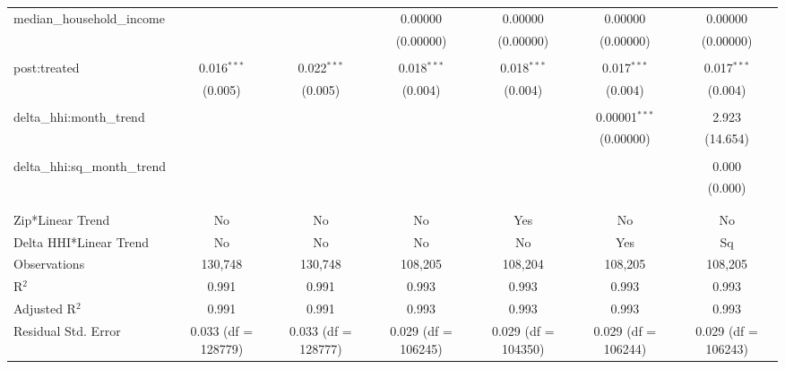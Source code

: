 \begin{table}[H]
{\begin{tabular}{@{\extracolsep{5pt}}lcccccc}
  median\_household\_income &  &  & 0.00000 & 0.00000 & 0.00000 & 0.00000 \\  

   &  &  & (0.00000) & (0.00000) & (0.00000) & (0.00000) \\  

   & & & & & & \\  

  post:treated & 0.016$^{***}$ & 0.022$^{***}$ & 0.018$^{***}$ & 0.018$^{***}$ & 0.017$^{***}$ & 0.017$^{***}$ \\  

   & (0.005) & (0.005) & (0.004) & (0.004) & (0.004) & (0.004) \\  

   & & & & & & \\  

  delta\_hhi:month\_trend &  &  &  &  & 0.00001$^{***}$ & 2.923 \\  

   &  &  &  &  & (0.00000) & (14.654) \\  

   & & & & & & \\  

  delta\_hhi:sq\_month\_trend &  &  &  &  &  & 0.000 \\  

   &  &  &  &  &  & (0.000) \\  

   & & & & & & \\  

 \hline \\[-1.8ex]  

 Zip*Linear Trend & No & No & No & Yes & No & No \\  

 Delta HHI*Linear Trend & No & No & No & No & Yes & Sq \\  

 Observations & 130,748 & 130,748 & 108,205 & 108,204 & 108,205 & 108,205 \\  

 R$^{2}$ & 0.991 & 0.991 & 0.993 & 0.993 & 0.993 & 0.993 \\  

 Adjusted R$^{2}$ & 0.991 & 0.991 & 0.993 & 0.993 & 0.993 & 0.993 \\  

 Residual Std. Error & 0.033 (df = 128779) & 0.033 (df = 128777) & 0.029 (df = 106245) & 0.029 (df = 104350) & 0.029 (df = 106244) & 0.029 (df = 106243) \\  


\end{tabular}}
\end{table}
